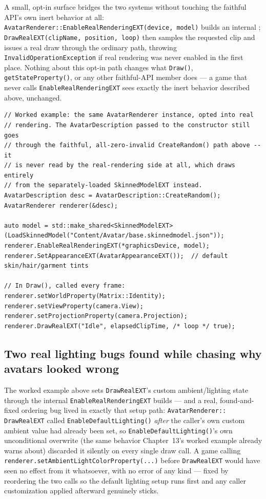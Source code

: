 A small, opt-in surface bridges the two systems without touching the faithful API's own
inert behavior at all: \texttt{AvatarRenderer::EnableRealRenderingEXT(device, model)} builds
an internal ; \texttt{DrawRealEXT(clipName, position, loop)} then
samples the requested clip and issues a real draw through the ordinary
 path, throwing \texttt{InvalidOperationException} if real rendering
was never enabled in the first place. Nothing about this opt-in path changes what
\texttt{Draw()}, \texttt{getStateProperty()}, or any other faithful-API member does --- a game
that never calls \texttt{EnableRealRenderingEXT} sees exactly the inert behavior described
above, unchanged.

\begin{lstlisting}
// Worked example: the same AvatarRenderer instance, opted into real
// rendering. The AvatarDescription passed to the constructor still goes
// through the faithful, all-zero-invalid CreateRandom() path above -- it
// is never read by the real-rendering side at all, which draws entirely
// from the separately-loaded SkinnedModelEXT instead.
AvatarDescription desc = AvatarDescription::CreateRandom();
AvatarRenderer renderer(&desc);

auto model = std::make_shared<SkinnedModelEXT>(LoadSkinnedModel("Content/Avatar/base.skinnedmodel.json"));
renderer.EnableRealRenderingEXT(*graphicsDevice, model);
renderer.SetAppearanceEXT(AvatarAppearanceEXT());  // default skin/hair/garment tints

// In Draw(), called every frame:
renderer.setWorldProperty(Matrix::Identity);
renderer.setViewProperty(camera.View);
renderer.setProjectionProperty(camera.Projection);
renderer.DrawRealEXT("Idle", elapsedClipTime, /* loop */ true);
\end{lstlisting}

\subsection{Two real lighting bugs found while chasing why avatars looked wrong}

The worked example above sets \texttt{DrawRealEXT}'s custom ambient/lighting state through the
internal  \texttt{EnableRealRenderingEXT} builds --- and a real,
found-and-fixed ordering bug lived in exactly that setup path: \texttt{AvatarRenderer::%
DrawRealEXT} called \texttt{EnableDefaultLighting()} \emph{after} the caller's own custom
ambient value had already been set, so \texttt{EnableDefaultLighting()}'s own unconditional
overwrite (the same behavior Chapter~13's  worked example already warns
about) discarded it silently on every single draw call. A game calling
\texttt{renderer.setAmbientLightColorProperty(...)} before \texttt{DrawRealEXT} would have seen
no effect from it whatsoever, with no error of any kind --- fixed by reordering the two calls
so the default lighting setup runs first and any caller customization applied afterward
genuinely sticks.

